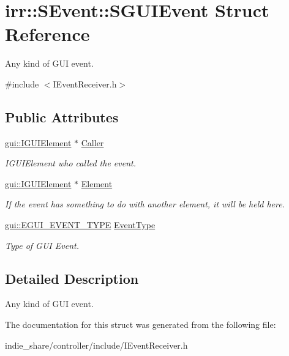 \hypertarget{structirr_1_1SEvent_1_1SGUIEvent}{}\section{irr\+:\+:S\+Event\+:\+:S\+G\+U\+I\+Event Struct Reference}
\label{structirr_1_1SEvent_1_1SGUIEvent}


Any kind of G\+UI event.  




{\ttfamily \#include $<$I\+Event\+Receiver.\+h$>$}

\subsection*{Public Attributes}
\begin{DoxyCompactItemize}
\item 
\mbox{\label{structirr_1_1SEvent_1_1SGUIEvent_a70eef30e3d3608cfb6a970aee2bbd1f4}} 
\hyperlink{classirr_1_1gui_1_1IGUIElement}{gui\+::\+I\+G\+U\+I\+Element} $\ast$ \hyperlink{structirr_1_1SEvent_1_1SGUIEvent_a70eef30e3d3608cfb6a970aee2bbd1f4}{Caller}
\begin{DoxyCompactList}\small\item\em I\+G\+U\+I\+Element who called the event. \end{DoxyCompactList}\item 
\mbox{\label{structirr_1_1SEvent_1_1SGUIEvent_a8456144a8da4b7328a2b64089c8f28a1}} 
\hyperlink{classirr_1_1gui_1_1IGUIElement}{gui\+::\+I\+G\+U\+I\+Element} $\ast$ \hyperlink{structirr_1_1SEvent_1_1SGUIEvent_a8456144a8da4b7328a2b64089c8f28a1}{Element}
\begin{DoxyCompactList}\small\item\em If the event has something to do with another element, it will be held here. \end{DoxyCompactList}\item 
\mbox{\label{structirr_1_1SEvent_1_1SGUIEvent_a96745fdb14db858583f9bb7abfd6bfbc}} 
\hyperlink{namespaceirr_1_1gui_aeac71ad17341a4b6e9026ae11d576808}{gui\+::\+E\+G\+U\+I\+\_\+\+E\+V\+E\+N\+T\+\_\+\+T\+Y\+PE} \hyperlink{structirr_1_1SEvent_1_1SGUIEvent_a96745fdb14db858583f9bb7abfd6bfbc}{Event\+Type}
\begin{DoxyCompactList}\small\item\em Type of G\+UI Event. \end{DoxyCompactList}\end{DoxyCompactItemize}


\subsection{Detailed Description}
Any kind of G\+UI event. 

The documentation for this struct was generated from the following file\+:\begin{DoxyCompactItemize}
\item 
indie\+\_\+share/controller/include/I\+Event\+Receiver.\+h\end{DoxyCompactItemize}

